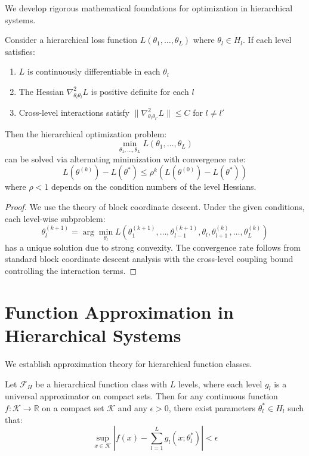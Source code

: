 We develop rigorous mathematical foundations for optimization in hierarchical systems.

\begin{theorem}
\label{thm:hierarchical_decomposition}
Consider a hierarchical loss function $L(\theta_1, \ldots, \theta_L)$ where $\theta_l \in H_l$. If each level satisfies:
\begin{enumerate}
\item $L$ is continuously differentiable in each $\theta_l$
\item The Hessian $\nabla^2_{\theta_l \theta_l} L$ is positive definite for each $l$
\item Cross-level interactions satisfy $\|\nabla^2_{\theta_l \theta_{l'}} L\| \leq C$ for $l \neq l'$
\end{enumerate}
Then the hierarchical optimization problem:
$$\min_{\theta_1, \ldots, \theta_L} L(\theta_1, \ldots, \theta_L)$$
can be solved via alternating minimization with convergence rate:
$$L(\theta^{(k)}) - L(\theta^*) \leq \rho^k (L(\theta^{(0)}) - L(\theta^*))$$
where $\rho < 1$ depends on the condition numbers of the level Hessians.
\end{theorem}

\begin{proof}
We use the theory of block coordinate descent. Under the given conditions, each level-wise subproblem:
$$\theta_l^{(k+1)} = \arg\min_{\theta_l} L(\theta_1^{(k+1)}, \ldots, \theta_{l-1}^{(k+1)}, \theta_l, \theta_{l+1}^{(k)}, \ldots, \theta_L^{(k)})$$
has a unique solution due to strong convexity. The convergence rate follows from standard block coordinate descent analysis with the cross-level coupling bound controlling the interaction terms.
\end{proof}

\section{Function Approximation in Hierarchical Systems}

We establish approximation theory for hierarchical function classes.

\begin{theorem}
\label{thm:hierarchical_universal_approximation}
Let $\mathcal{F}_H$ be a hierarchical function class with $L$ levels, where each level $g_l$ is a universal approximator on compact sets. Then for any continuous function $f: \mathcal{K} \to \mathbb{R}$ on a compact set $\mathcal{K}$ and any $\epsilon > 0$, there exist parameters $\theta_l^* \in H_l$ such that:
$$\sup_{x \in \mathcal{K}} \left|f(x) - \sum_{l=1}^L g_l(x; \theta_l^*)\right| < \epsilon$$
\end{theorem}


